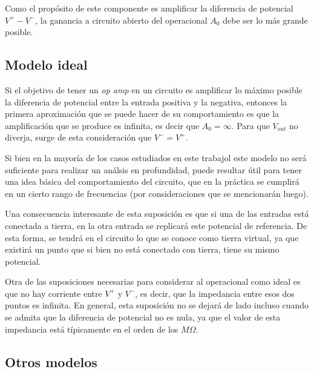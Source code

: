 \documentclass[main.tex]{subfiles}
\begin{document}
Como el prop\'osito de este componente es amplificar la diferencia de potencial $V^+ - V^-$, la ganancia a circuito abierto del operacional $A_0$ debe ser lo m\'as grande posible.


\subsection{Modelo ideal}
Si el objetivo de tener un \textit{op amp} en un circuito es amplificar lo m\'aximo posible la diferencia de potencial entre la entrada positiva y la negativa, entonces la primera aproximaci\'on que se puede hacer de su comportamiento es que la amplificaci\'on que se produce es infinita, es decir que $A_0=\infty$. Para que $V_{out}$ no diverja, surge de esta consideraci\'on que $V^- = V^+$. \par

Si bien en la mayor\'ia de los casos estudiados en este trabajol este modelo no ser\'a suficiente para realizar un an\'alsis en profundidad, puede resultar \'util para tener una idea b\'asica del comportamiento del circuito, que en la pr\'actica se cumplir\'a en un cierto rango de frecuencias (por consideraciones que se mencionar\'an luego). \par

Una consecuencia interesante de esta suposici\'on es que si una de las entradas est\'a conectada a tierra, en la otra entrada se replicar\'a este potencial de referencia. De esta forma, se tendr\'a en el circuito lo que se conoce como tierra virtual, ya que existir\'a un punto que si bien no est\'a conectado con tierra, tiene su mismo potencial. \par


Otra de las suposiciones necesarias para considerar al operacional como ideal es que no hay corriente entre $V^+$ y $V^-$, es decir, que la impedancia entre esos dos puntos es infinita. En general, esta suposici\'on no se dejar\'a de lado incluso cuando se admita que la diferencia de potencial no es nula, ya que el valor de esta impedancia est\'a t\'ipicamente en el orden de los $M\Omega$.\par


\subsection{Otros modelos}
\end{document}
